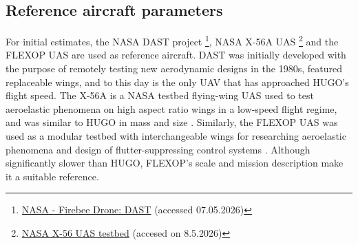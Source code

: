 
\subsection{Reference aircraft parameters}
\label{sub:lift_reference_aircraft}
For initial estimates, the NASA DAST project \footnote{\label{fn:DAST}\href{https://web.archive.org/web/20230310084826/https://www.nasa.gov/centers/dryden/multimedia/imagegallery/DAST/DAST_proj_desc.html}{NASA - Firebee Drone: DAST} (accessed 07.05.2026)}, NASA X-56A UAS \footnote{\label{url:x56a}\href{https://www.nasa.gov/aeronautics/x-56a-mutt/}{NASA X-56 UAS testbed} (accesed on 8.5.2026)} and the FLEXOP UAS \cite{Yu2022} are used as reference aircraft. DAST was initially developed with the purpose of remotely testing new aerodynamic designs in the 1980s, featured replaceable wings, and to this day is the only UAV that has approached HUGO's flight speed. The X-56A is a NASA testbed flying-wing UAS used to test aeroelastic phenomena on high aspect ratio wings in a low-speed flight regime, and was similar to HUGO in mass and size \cite{Schaefer2023}. Similarly, the FLEXOP UAS was used as a modular testbed with interchangeable wings for researching aeroelastic phenomena and design of flutter-suppressing control systems \cite{Bauer2020}. Although significantly slower than HUGO, FLEXOP's scale and mission description make it a suitable reference.



